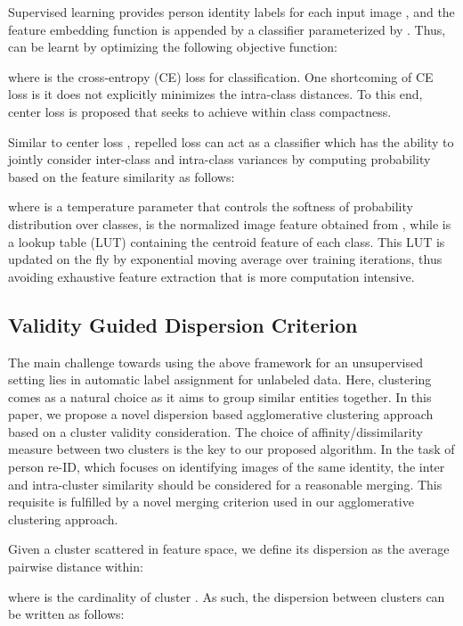 \documentclass[journal]{IEEEtran}
\begin{document}
Supervised learning provides person identity labels  for each input image , and the feature embedding function is appended by a classifier  parameterized by . Thus,  can be learnt by optimizing the following objective function:

where  is the cross-entropy (CE) loss for classification. One shortcoming of CE loss is it does not explicitly minimizes  the intra-class distances. To this end, center loss is proposed that seeks to achieve within class compactness. 

Similar to center loss \cite{wen2016discriminative,ding2018feature}, repelled loss \cite{xiao2017joint,lin2019bottom} can act as a classifier  which has the ability to jointly consider inter-class and intra-class variances by computing probability based on the feature similarity as follows:

where  is a temperature parameter that controls the softness of probability distribution over classes,  is the  normalized image feature obtained from , while  is a lookup table (LUT) containing the centroid feature of each class. This LUT is updated on the fly by exponential moving average \cite{lucas1990exponentially} over training iterations, thus avoiding exhaustive feature extraction that is more computation intensive.
 
\subsection{Validity Guided Dispersion Criterion}

The main challenge towards using the above framework for an unsupervised setting lies in automatic label assignment for unlabeled data. Here, clustering comes as a natural choice as it aims to group similar entities together. In this paper, we propose a novel dispersion based agglomerative clustering approach based on a cluster validity consideration. The choice of affinity/dissimilarity measure between two clusters is the key to our proposed algorithm. In the task of person re-ID, which focuses on identifying images of the same identity, the inter and intra-cluster similarity should be considered for a reasonable merging. This requisite is fulfilled by a novel merging criterion used in our agglomerative clustering approach.

Given a cluster  scattered in feature space, we define its dispersion  as the average pairwise distance within:

where  is the cardinality of cluster . As such, the dispersion between clusters can be written as follows:
\end{document}
